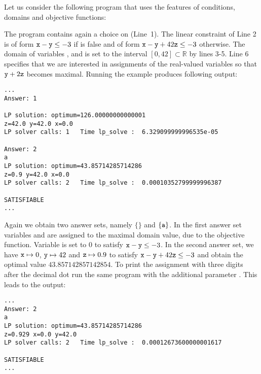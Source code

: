 \begin{example}\label{ex:lp:extended}
Let us consider the following program that uses the features of conditions, domains and objective functions:

The program contains again a choice on  (Line~1). 
%
The linear constraint of Line 2 is of form $\texttt{x}-\texttt{y}\leq-3$ if  is false 
and of form $\texttt{x}-\texttt{y}+42\texttt{z}\leq-3$ otherwise. 
%
The domain of variables ,  and  is set to the interval $[0,42]\subset\mathbb{R}$ by lines 3-5. 
%
Line 6 specifies that we are interested in assignments of the real-valued variables so that $\texttt{y}+2\texttt{z}$ becomes maximal. 
%
Running the example produces following output:
\begin{lstlisting}[numbers=none]
...
Answer: 1

LP solution: optimum=126.00000000000001
z=42.0 y=42.0 x=0.0
LP solver calls: 1   Time lp_solve :  6.329099999996535e-05

Answer: 2
a
LP solution: optimum=43.85714285714286
z=0.9 y=42.0 x=0.0
LP solver calls: 2   Time lp_solve :  0.00010352799999996387

SATISFIABLE
...
\end{lstlisting}
Again we obtain two answer sets, namely $\{\}$ and $\{\texttt{a}\}$. 
%
In the first answer set variables  and  are assigned to the maximal domain value, due to the objective function. 
%
Variable  is set to 0 to satisfy $\texttt{x}-\texttt{y}\leq-3$. 
%
In the second answer set, we have $\texttt{x}\mapsto0$, $\texttt{y}\mapsto42$ and $\texttt{z}\mapsto0.9$ to satisfy $\texttt{x}-\texttt{y}+42\texttt{z}\leq-3$ and 
obtain the optimal value $43.857142857142854$. 
%
To print the assignment with three digits after the decimal dot run the same program with the additional parameter .
%
This leads to the output: 
\begin{lstlisting}[numbers=none]
...
Answer: 2
a
LP solution: optimum=43.85714285714286
z=0.929 x=0.0 y=42.0
LP solver calls: 2   Time lp_solve :  0.00012673600000001617

SATISFIABLE
...
\end{lstlisting}
\end{example}


